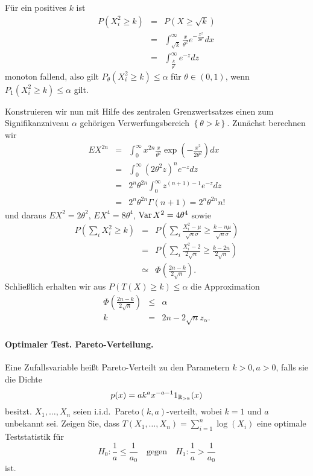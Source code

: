 Für ein positives $k$ ist 
\begin{eqnarray}
    P \left( X_i^2 \geq k \right) &=& P \left( X \geq \sqrt{k}  \right) \\
    &=& \int_{\sqrt{k}}^{\infty} \frac{x}{\theta^2} e^{ - \frac{x^2}{ 2 \theta^2}} d x \\
    &=& \int_{\frac{k}{\theta^2}}^{\infty} e^{-z} dz
\end{eqnarray}
monoton fallend, also gilt $P_\theta \left( X_i^2 \geq k \right) \leq \alpha$ für $\theta\in (0,1)$,
wenn $P_1 \left( X_i^2 \geq k \right)\leq \alpha$ gilt.

Konstruieren wir nun mit Hilfe des zentralen Grenzwertsatzes einen zum Signifikanzniveau 
$\alpha$ gehörigen Verwerfungsbereich $\left\{ \theta>k \right\}$. Zunächst berechnen wir
\begin{eqnarray}
    E X^{2n} &=&  \int_{0}^{\infty} x^{2n} \frac{x}{\theta^2} \exp \left( - \frac{x^2}{2\theta^2} \right) dx \\
    &=&  \int_{0}^{\infty} \left( 2 \theta^2 z \right)^n e^{-z} dz \\
    &=& 2^n \theta^{2n} \int_{0}^{\infty} z^{(n+1)-1}e^{-z} dz  \\
    &=& 2^n \theta^{2n} \Gamma(n+1) = 2^n \theta^{2n} n!
\end{eqnarray}
und daraus $E X^2 = 2 \theta^2$, $E X^4 = 8 \theta^4$, $\operatorname{Var} X^2 = 4 \theta^4$ sowie
\begin{eqnarray}
    P \left( \sum_{i} X_i^2 \geq k \right)&=&  
    P \left( \sum_{i}^{} \frac{X_i^2 - \mu}{\sqrt{n} \sigma} \geq \frac{k -n \mu}{\sqrt{n} \sigma} \right) \\
    &=& P \left( \sum_{i}^{} \frac{X_i^2 - 2}{2\sqrt{n}} \geq \frac{k-2n}{2\sqrt{n}} \right) \\
    &\simeq & \Phi \left( \frac{2n -k}{2 \sqrt{n}} \right). 
\end{eqnarray}
Schließlich erhalten wir aus $P \left( T(X) \geq k \right) \leq \alpha$ die Approximation
\begin{eqnarray}
    \Phi\left( \frac{2n - k}{ 2\sqrt{n}}  \right) &\leq & \alpha \\
    k &=& 2n - 2 \sqrt{n} z_\alpha.
\end{eqnarray}





\paragraph{Optimaler Test. Pareto-Verteilung. }  Eine Zufallsvariable heißt Pareto-Verteilt
zu den Parametern $k>0,a>0$, falls sie die Dichte 
\begin{equation}
    p(x) = a k^a x^{-a-1} 1_{\mathbb R_{>k}}(x)
\end{equation}
besitzt. $X_1,\ldots,X_n$ seien i.i.d.\ Pareto$(k,a)$-verteilt, wobei $k=1$ und $a$ unbekannt sei.
Zeigen Sie, dass $T(X_1,\ldots,X_n)= \sum_{i=1}^{n} \log\left( X_i \right)$ eine optimale 
Teststatistik für
\begin{equation}
    H_0 : \frac{1}{a} \leq \frac{1}{a_0} \quad \textrm{gegen} \quad H_1 : \frac{1}{a} > \frac{1}{a_0}
\end{equation}
ist.

